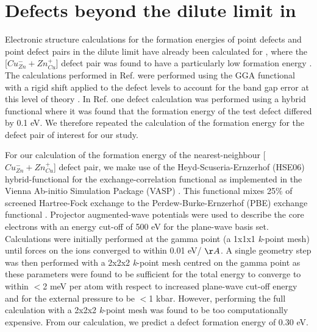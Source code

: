 \documentclass[11pt, twoside]{report}
\begin{document}
\section{Defects beyond the dilute limit in {\CZTS}}\label{CZTS_beyond_dilute}
Electronic structure calculations for the formation energies of point defects and point defect pairs in the dilute limit have already been calculated for {\CZTS}, where the [$Cu_{Zn}^- + Zn_{Cu}^+$] defect pair was found to have a particularly low formation energy \cite{defects_Chen}.
The calculations performed in Ref.  were performed using the GGA functional with a rigid shift applied to the defect levels to account for the band gap error at this level of theory \cite{Lany_defects}. In Ref.  one defect calculation was performed using a hybrid functional where it was found that the formation energy of the test defect differed by 0.1 eV. We therefore repeated the calculation of the formation energy for the defect pair of interest for our study.

For our calculation of the formation energy of the nearest-neighbour [$Cu_{Zn}^- + Zn_{Cu}^+$] defect pair, we make use of the Heyd-Scuseria-Ernzerhof (HSE06) hybrid-functional \cite{HSE} for the exchange-correlation functional as implemented in the Vienna Ab-initio Simulation Package (VASP) \cite{VASP}. This functional mixes 25\% of screened Hartree-Fock exchange to the Perdew-Burke-Ernzerhof (PBE) exchange functional \cite{PBE}. Projector augmented-wave potentials \cite{PAW} were used to describe the core electrons with an energy cut-off of 500 eV for the plane-wave basis set. Calculations were initially performed at the gamma point (a 1x1x1 \textit{k}-point mesh) until forces on the ions converged to within 0.01 eV/ $\AA$. 
A single geometry step was then performed with a 2x2x2 \textit{k}-point mesh centred on the gamma point as these parameters were found to be sufficient for the total energy to converge to within $<$2 meV  per atom with respect to increased plane-wave cut-off energy and for the external pressure to be $<$1 kbar. However, performing the full calculation with a 2x2x2 \textit{k}-point mesh was found to be too computationally expensive. 
From our calculation, we predict a defect formation energy of 0.30 eV.
\end{document}
